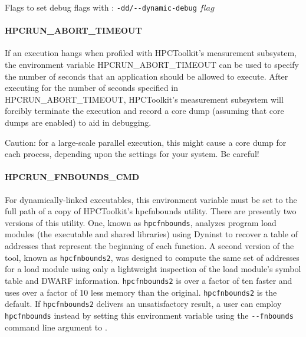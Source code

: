 \parg
Flags to set debug flags with \hpcrun: \verb|-dd/--dynamic-debug| $flag$

\paragraph{HPCRUN\_ABORT\_TIMEOUT}

If an execution hangs when profiled with HPCToolkit's measurement
subsystem, the environment variable HPCRUN\_ABORT\_TIMEOUT can be
used to specify the number of seconds that an application should
be allowed to execute. After executing for the number of seconds
specified in HPCRUN\_ABORT\_TIMEOUT, HPCToolkit's measurement
subsystem will forcibly terminate the execution and record a core
dump (assuming that core dumps are enabled) to aid in debugging.

\parg
Caution: for a large-scale parallel execution, this might cause a
core dump for each process, depending upon the settings for your
system. Be careful!

\paragraph{HPCRUN\_FNBOUNDS\_CMD}

For dynamically-linked executables, this environment variable must
be set to the full path of a copy of HPCToolkit's hpcfnbounds
utility. There are presently two versions of this utility. One, known as \verb|hpcfnbounds|, analyzes program load modules (the executable and shared libraries) using Dyninst to recover a table of addresses that represent the beginning of each function. A second version of the tool, known as \verb|hpcfnbounds2|, was designed to compute  the same set of addresses for a load module using only a lightweight inspection of the load module's symbol table and DWARF information. \verb|hpcfnbounds2| is over a factor of ten faster and uses over a factor of 10 less memory than the original. \verb|hpcfnbounds2|  is the default. If \verb|hpcfnbounds2| delivers an unsatisfactory result, a user can employ \verb|hpcfnbounds| instead by setting this environment variable using the \verb|--fnbounds| command line argument to \hpcrun{}.


